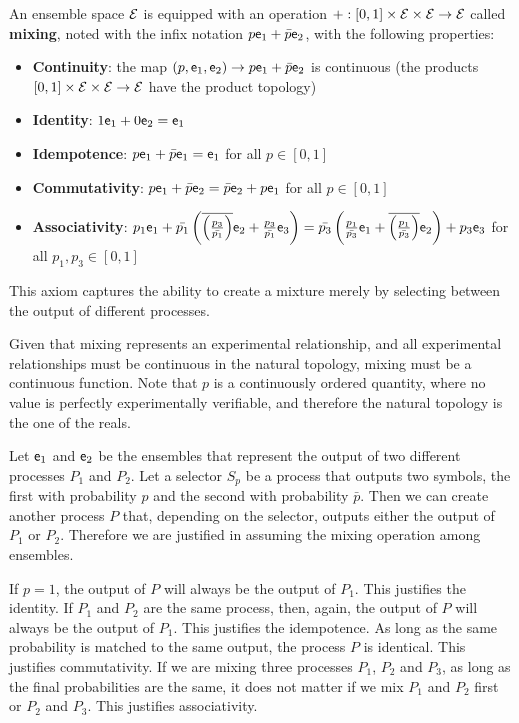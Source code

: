 \begin{axiom}
	An ensemble space $\mathcal{E}$ is equipped with an operation $+ : [0, 1] \times \mathcal{E} \times \mathcal{E} \to \mathcal{E}$ called \textbf{mixing}, noted with the infix notation $p \mathsf{e}_1 + \bar{p} \mathsf{e}_2$, with the following properties:
	\begin{itemize}
		\item \textbf{Continuity}: the map $(p, \mathsf{e}_1, \mathsf{e}_2)  \to p \mathsf{e}_1 + \bar{p} \mathsf{e}_2$ is continuous (the products $[0, 1] \times \mathcal{E} \times \mathcal{E} \to \mathcal{E}$ have the product topology)
		\item \textbf{Identity}: $1 \mathsf{e}_1 + 0 \mathsf{e}_2 = \mathsf{e}_1$
		\item \textbf{Idempotence}:  $p \mathsf{e}_1 + \bar{p} \mathsf{e}_1 = \mathsf{e}_1$ for all $p \in [0,1]$
		\item \textbf{Commutativity}: $p \mathsf{e}_1 + \bar{p} \mathsf{e}_2 = \bar{p} \mathsf{e}_2 + p \mathsf{e}_1$ for all $p \in [0,1]$
		\item \textbf{Associativity}: $p_1 \mathsf{e}_1 + \bar{p_1}\left(\overline{\left(\frac{p_3}{\bar{p_1}}\right)}\mathsf{e}_2 + \frac{p_3}{\bar{p_1}}\mathsf{e}_3\right) =  \bar{p_3}\left(\frac{p_1}{\bar{p_3}} \mathsf{e}_1 +  \overline{\left(\frac{p_1}{\bar{p_3}}\right)}\mathsf{e}_2\right) + p_3 \mathsf{e}_3$ for all $p_1, p_3 \in [0,1]$
	\end{itemize}
\end{axiom}

\begin{justification}
	This axiom captures the ability to create a mixture merely by selecting between the output of different processes.
	
	Given that mixing represents an experimental relationship, and all experimental relationships must be continuous in the natural topology, mixing must be a continuous function. Note that $p$ is a continuously ordered quantity, where no value is perfectly experimentally verifiable, and therefore the natural topology is the one of the reals.

	Let $\mathsf{e}_1$ and $\mathsf{e}_2$ be the ensembles that represent the output of two different processes $P_1$ and $P_2$. Let a selector $S_p$ be a process that outputs two symbols, the first with probability $p$ and the second with probability $\bar{p}$. Then we can create another process $P$ that, depending on the selector, outputs either the output of $P_1$ or $P_2$. Therefore we are justified in assuming the mixing operation among ensembles.

	If $p=1$, the output of $P$ will always be the output of $P_1$. This justifies the identity. If $P_1$ and $P_2$ are the same process, then, again, the output of $P$ will always be the output of $P_1$. This justifies the idempotence. As long as the same probability is matched to the same output, the process $P$ is identical. This justifies commutativity. If we are mixing three processes $P_1$, $P_2$ and $P_3$, as long as the final probabilities are the same, it does not matter if we mix $P_1$ and $P_2$ first or $P_2$ and $P_3$. This justifies associativity.
\end{justification}

